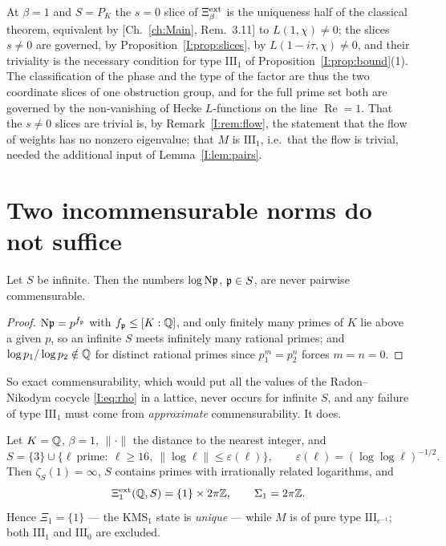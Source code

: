 \begin{remark}\label{I:rem:unify}
At $\beta=1$ and $S=P_K$ the $s=0$ slice of $\Xi^{\mathrm{ext}}_\beta$ is the uniqueness half of the classical
theorem, equivalent by [Ch.~\ref{ch:Main}, Rem.~3.11] to $L(1,\chi)\ne0$; the slices $s\ne0$ are
governed, by Proposition~\ref{I:prop:slices}, by $L(1-i\tau,\chi)\ne0$, and their triviality
is the necessary condition for type $\mathrm{III}_1$ of Proposition~\ref{I:prop:bound}(1).
The classification of the phase and the type of the factor are thus the two coordinate
slices of one obstruction group, and for the full prime set both are governed by the
non-vanishing of Hecke $L$-functions on the line $\operatorname{Re}=1$. That the
$s\ne0$ slices are trivial is, by Remark~\ref{I:rem:flow}, the statement that the flow of
weights has no nonzero eigenvalue; that $M$ is $\mathrm{III}_1$, i.e.\ that the flow is
trivial, needed the additional input of Lemma~\ref{I:lem:pairs}.
\end{remark}

\section{Two incommensurable norms do not suffice}\label{I:sec:counter}

\begin{lemma}\label{I:lem:noexact}
Let $S$ be infinite. Then the numbers $\log\mathrm{N}\mathfrak{p}$, $\mathfrak{p}\in S$, are never pairwise
commensurable.
\end{lemma}

\begin{proof}
$\mathrm{N}\mathfrak{p}=p^{f_{\mathfrak{p}}}$ with $f_{\mathfrak{p}}\le[K:\mathbb{Q}]$, and only finitely many primes of $K$ lie above a
given $p$, so an infinite $S$ meets infinitely many rational primes; and
$\log p_1/\log p_2\notin\mathbb{Q}$ for distinct rational primes since $p_1^m=p_2^n$ forces $m=n=0$.
\end{proof}

So exact commensurability, which would put all the values of the Radon--Nikodym cocycle
\eqref{I:eq:rho} in a lattice, never occurs for infinite $S$, and any failure of type
$\mathrm{III}_1$ must come from \emph{approximate} commensurability. It does.

\begin{theorem}\label{I:thm:counter}
Let $K=\mathbb{Q}$, $\beta=1$, $\|\cdot\|$ the distance to the nearest integer, and
\begin{equation}\label{I:eq:band}
S=\{3\}\cup\bigl\{\ell\ \text{prime}:\ \ell\ge16,\ \|\log\ell\|\le\varepsilon(\ell)\bigr\},
\qquad\varepsilon(\ell)=(\log\log\ell)^{-1/2}.
\end{equation}
Then $\zeta_S(1)=\infty$, $S$ contains primes with irrationally related logarithms, and
\[
\Xi^{\mathrm{ext}}_1(\mathbb{Q},S)=\{1\}\times2\pi\mathbb{Z},\qquad \Sigma_1=2\pi\mathbb{Z} .
\]
Hence $\Xi_1=\{1\}$ --- the $\mathrm{KMS}_1$ state is \emph{unique} --- while $M$ is of pure
type $\mathrm{III}_{e^{-1}}$; both $\mathrm{III}_1$ and $\mathrm{III}_0$ are excluded.
\end{theorem}

